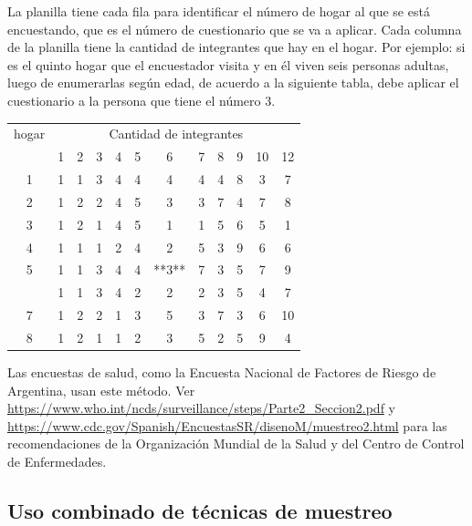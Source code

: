 \documentclass[]{book}
\begin{document}
La planilla tiene cada fila para identificar el número de hogar al que se está encuestando, que es el número de cuestionario que se va a aplicar. Cada columna de la planilla tiene la cantidad de integrantes que hay en el hogar. Por ejemplo: si es el quinto hogar que el encuestador visita y en él viven seis personas adultas, luego de enumerarlas según edad, de acuerdo a la siguiente tabla, debe aplicar el cuestionario a la persona que tiene el número 3.

\begin{table}[H]
\centering
\begin{tabular}{cccccccccccc}
\toprule
\multicolumn{1}{c}{hogar} & \multicolumn{11}{c}{Cantidad de integrantes} \\
\cmidrule(l{3pt}r{3pt}){1-1} \cmidrule(l{3pt}r{3pt}){2-12}
 & 1 & 2 & 3 & 4 & 5 & 6 & 7 & 8 & 9 & 10 & 12\\
\midrule
\rowcolor{gray!6}  1 & 1 & 1 & 3 & 4 & 4 & 4 & 4 & 4 & 8 & 3 & 7\\
2 & 1 & 2 & 2 & 4 & 5 & 3 & 3 & 7 & 4 & 7 & 8\\
\rowcolor{gray!6}  3 & 1 & 2 & 1 & 4 & 5 & 1 & 1 & 5 & 6 & 5 & 1\\
4 & 1 & 1 & 1 & 2 & 4 & 2 & 5 & 3 & 9 & 6 & 6\\
\rowcolor{gray!6}  5 & 1 & 1 & 3 & 4 & 4 & **3** & 7 & 3 & 5 & 7 & 9\\
\addlinespace
6 & 1 & 1 & 3 & 4 & 2 & 2 & 2 & 3 & 5 & 4 & 7\\
\rowcolor{gray!6}  7 & 1 & 2 & 2 & 1 & 3 & 5 & 3 & 7 & 3 & 6 & 10\\
8 & 1 & 2 & 1 & 1 & 2 & 3 & 5 & 2 & 5 & 9 & 4\\
\bottomrule
\end{tabular}
\end{table}

Las encuestas de salud, como la Encuesta Nacional de Factores de Riesgo de Argentina, usan este método. Ver \url{https://www.who.int/ncds/surveillance/steps/Parte2_Seccion2.pdf} y \url{https://www.cdc.gov/Spanish/EncuestasSR/disenoM/muestreo2.html} para las recomendaciones de la Organización Mundial de la Salud y del Centro de Control de Enfermedades.

\hypertarget{uso-combinado-de-tecnicas-de-muestreo}{%
\subsection{Uso combinado de técnicas de muestreo}\label{uso-combinado-de-tecnicas-de-muestreo}}
\end{document}
